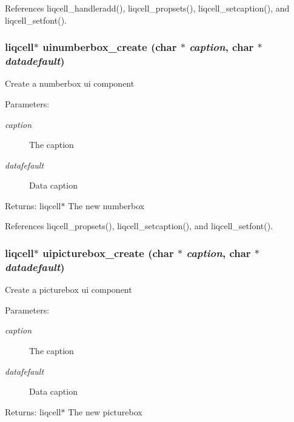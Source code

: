 References liqcell\_\-handleradd(), liqcell\_\-propsets(), liqcell\_\-setcaption(), and liqcell\_\-setfont().
\subsubsection[{uinumberbox\_\-create}]{\setlength{\rightskip}{0pt plus 5cm}liqcell$\ast$ uinumberbox\_\-create (char $\ast$ {\em caption}, \/  char $\ast$ {\em datadefault})}\label{de/d77/liqui_8c_e2db71571319270d36f70e807d31e81c}


Create a numberbox ui component \begin{Desc}
\item[Parameters:]
\begin{description}
\item[{\em caption}]The caption \item[{\em datafefault}]Data caption \end{description}
\end{Desc}
\begin{Desc}
\item[Returns:]liqcell$\ast$ The new numberbox \end{Desc}


References liqcell\_\-propsets(), liqcell\_\-setcaption(), and liqcell\_\-setfont().
\subsubsection[{uipicturebox\_\-create}]{\setlength{\rightskip}{0pt plus 5cm}liqcell$\ast$ uipicturebox\_\-create (char $\ast$ {\em caption}, \/  char $\ast$ {\em datadefault})}\label{de/d77/liqui_8c_ea53b9bac4fc2fac78be995c2a556ef2}


Create a picturebox ui component \begin{Desc}
\item[Parameters:]
\begin{description}
\item[{\em caption}]The caption \item[{\em datafefault}]Data caption \end{description}
\end{Desc}
\begin{Desc}
\item[Returns:]liqcell$\ast$ The new picturebox \end{Desc}


